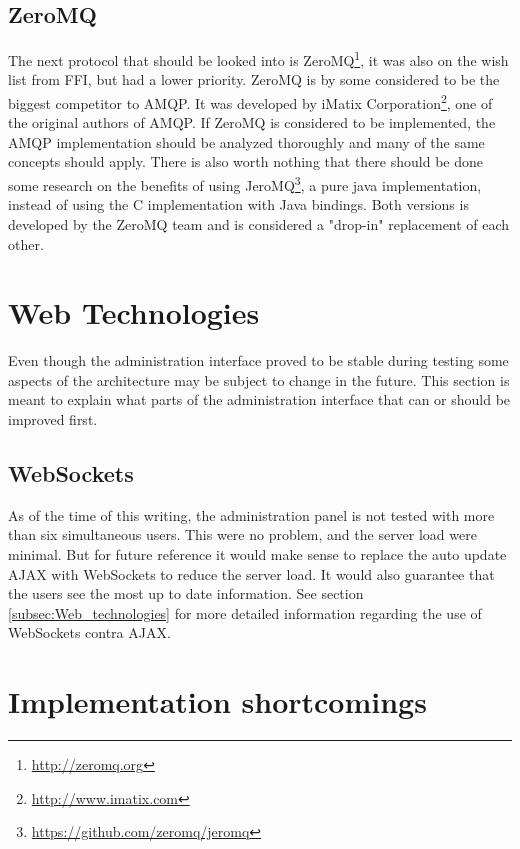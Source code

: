 \subsection{ZeroMQ}
The next protocol that should be looked into is ZeroMQ\footnote{\url{http://zeromq.org}}, it was also on the wish list from FFI, but had a lower priority. ZeroMQ is by some considered to be the biggest competitor to AMQP. It was developed by iMatix Corporation\footnote{\url{http://www.imatix.com}}, one of the original authors of AMQP. If ZeroMQ is considered to be implemented, the AMQP implementation should be analyzed thoroughly and many of the same concepts should apply. There is also worth nothing that there should be done some research on the benefits of using JeroMQ\footnote{\url{https://github.com/zeromq/jeromq}}, a pure java implementation, instead of using the C implementation with Java bindings. Both versions is developed by the ZeroMQ team and is considered a "drop-in" replacement of each other.

\section{Web Technologies}
Even though the administration interface proved to be stable during testing some aspects of the architecture may be subject to change in the future. This section is meant to explain what parts of the administration interface that can or should be improved first. 

\subsection{WebSockets}
As of the time of this writing, the administration panel is not tested with more than six simultaneous users. This were no problem, and the server load were minimal. But for future reference it would make sense to replace the auto update AJAX with WebSockets to reduce the server load. It would also guarantee that the users see the most up to date information. See section \ref{subsec:Web_technologies} for more detailed information regarding the use of WebSockets contra AJAX.

\section{Implementation shortcomings}
